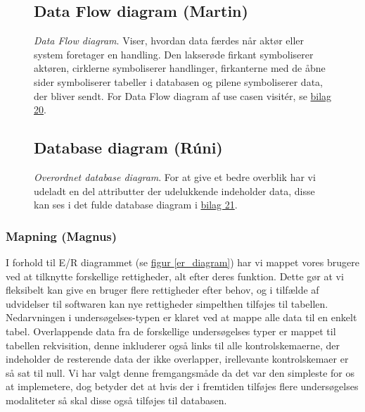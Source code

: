 \FloatBarrier
\begin{figure}[h]
\subsection*{Data Flow diagram (Martin)}
\centering
{}
\caption{\emph{Data Flow diagram}. Viser, hvordan data færdes når aktør eller
system foretager en handling. Den lakserøde firkant symboliserer aktøren,
cirklerne symboliserer handlinger, firkanterne med de åbne sider symboliserer
tabeller i databasen og pilene symboliserer data, der bliver sendt. For Data
Flow diagram af use casen visitér, se \hyperref[Bilag20]{bilag 20}.
\label{data_flow_diagram}}
\end{figure}
\FloatBarrier
\begin{figure}[h]
\subsection*{Database diagram (Rúni)}
\centering
{}
\caption{\emph{Overordnet database diagram}. For at give et bedre overblik har
vi udeladt en del attributter der udelukkende indeholder data, disse kan ses i
det fulde database diagram i \hyperref[Bilag21]{bilag 21}.
\label{database_diagram}}
\end{figure}
\FloatBarrier
\subsubsection*{Mapning (Magnus)}
I forhold til E/R diagrammet (se \hyperref[er_diagram]{figur
\ref*{er_diagram}}) har vi mappet vores brugere ved at tilknytte forskellige
rettigheder, alt efter deres funktion. Dette gør at vi fleksibelt kan give en
bruger flere rettigheder efter behov, og i tilfælde af udvidelser til softwaren
kan nye rettigheder simpelthen tilføjes til tabellen. Nedarvningen i
undersøgelses-typen er klaret ved at mappe alle data til en enkelt tabel.
Overlappende data fra de forskellige undersøgelses typer er mappet til tabellen
rekvisition, denne inkluderer også links til alle kontrolskemaerne, der
indeholder de resterende data der ikke overlapper, irellevante kontrolskemaer er
så sat til null. Vi har valgt denne fremgangsmåde da det var den simpleste for
os at implemetere, dog betyder det at hvis der i fremtiden tilføjes flere
undersøgelses modaliteter så skal disse også tilføjes til databasen.

